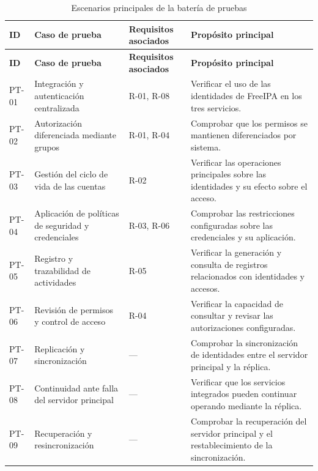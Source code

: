 \begin{longtable}{|
	>{\raggedright\arraybackslash}p{1.5cm}|
	>{\raggedright\arraybackslash}p{4.0cm}|
	>{\raggedright\arraybackslash}p{2.5cm}|
	>{\raggedright\arraybackslash}p{5.5cm}|}

	\caption{Escenarios principales de la batería de pruebas}
	\label{tab:bateria-pruebas}
	\\
	\hline
	\rowcolor[gray]{0.85}
	\textbf{ID}                   &
	\textbf{Caso de prueba}       &
	\textbf{Requisitos asociados} &
	\textbf{Propósito principal}
	\\
	\hline
	\endfirsthead

	\hline
	\rowcolor[gray]{0.85}
	\textbf{ID}                   &
	\textbf{Caso de prueba}       &
	\textbf{Requisitos asociados} &
	\textbf{Propósito principal}
	\\
	\hline
	\endhead

	PT-01                         & Integración y autenticación centralizada            & R-01, R-08 & Verificar el uso de las identidades de FreeIPA en los tres servicios.                        \\ \hline
	PT-02                         & Autorización diferenciada mediante grupos           & R-01, R-04 & Comprobar que los permisos se mantienen diferenciados por sistema.                           \\ \hline
	PT-03                         & Gestión del ciclo de vida de las cuentas            & R-02       & Verificar las operaciones principales sobre las identidades y su efecto sobre el acceso.     \\ \hline
	PT-04                         & Aplicación de políticas de seguridad y credenciales & R-03, R-06 & Comprobar las restricciones configuradas sobre las credenciales y su aplicación.             \\ \hline
	PT-05                         & Registro y trazabilidad de actividades              & R-05       & Verificar la generación y consulta de registros relacionados con identidades y accesos.      \\ \hline
	PT-06                         & Revisión de permisos y control de acceso            & R-04       & Verificar la capacidad de consultar y revisar las autorizaciones configuradas.               \\ \hline
	PT-07                         & Replicación y sincronización                        & ---        & Comprobar la sincronización de identidades entre el servidor principal y la réplica.         \\ \hline
	PT-08                         & Continuidad ante falla del servidor principal       & ---        & Verificar que los servicios integrados pueden continuar operando mediante la réplica.        \\ \hline
	PT-09                         & Recuperación y resincronización                     & ---        & Comprobar la recuperación del servidor principal y el restablecimiento de la sincronización. \\ \hline
\end{longtable}
\endgroup
\normalsize

